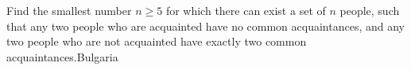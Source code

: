 Find the smallest number $n \geq 5$ for which there can exist a set of $n$ people, such that any two people who are acquainted have no common acquaintances, and any two people who are not acquainted have exactly two common acquaintances.Bulgaria